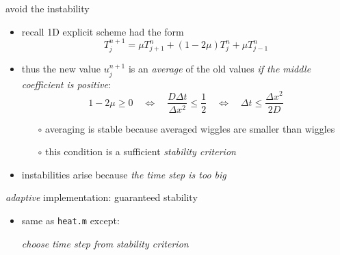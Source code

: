 \begin{frame}{avoid the instability}
\label{slide:maxprinc}

\begin{itemize}
\item recall 1D explicit scheme had the form 
	$$T_j^{n+1} = \mu T_{j+1}^n + (1 - 2 \mu) T_j^n + \mu T_{j-1}^n$$
\item thus the new value $u_j^{n+1}$ is an \emph{average} of the old values \emph{if the middle coefficient is positive}:
	$$1 - 2 \mu \ge 0 \quad \iff \quad  \frac{D\Delta t}{\Delta x^2} \le \frac{1}{2} \quad \iff \quad \Delta t \le \frac{\Delta x^2}{2 D}$$
    \begin{itemize}
    \item[$\circ$] averaging is stable because averaged wiggles are smaller than wiggles
    \item[$\circ$] this condition is a sufficient \emph{stability criterion}
    \end{itemize}
\item instabilities arise because \emph{the time step is too big}
\end{itemize}
\end{frame}


\begin{frame}{\textsl{adaptive} implementation: guaranteed stability}


\begin{itemize}
\item same as \texttt{heat.m} except:

\begin{center}
\emph{choose time step from stability criterion}
\end{center}
\end{itemize}\end{frame}


